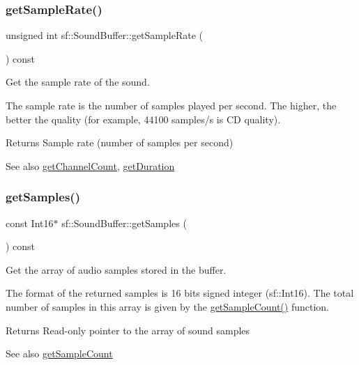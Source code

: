 \subsubsection{\texorpdfstring{get\+Sample\+Rate()}{getSampleRate()}}
{\footnotesize\ttfamily unsigned int sf\+::\+Sound\+Buffer\+::get\+Sample\+Rate (\begin{DoxyParamCaption}{ }\end{DoxyParamCaption}) const}



Get the sample rate of the sound. 

The sample rate is the number of samples played per second. The higher, the better the quality (for example, 44100 samples/s is CD quality).

\begin{DoxyReturn}{Returns}
Sample rate (number of samples per second)
\end{DoxyReturn}
\begin{DoxySeeAlso}{See also}
\hyperlink{classsf_1_1_sound_buffer_a127707b831d875ed790eef1aa2b9fcc3}{get\+Channel\+Count}, \hyperlink{classsf_1_1_sound_buffer_a280a581d9b360fd16121714c51fc8261}{get\+Duration} 
\end{DoxySeeAlso}
\mbox{\label{classsf_1_1_sound_buffer_ab9b2525a8da64cb266ba728aff7adecb}} 
\subsubsection{\texorpdfstring{get\+Samples()}{getSamples()}}
{\footnotesize\ttfamily const Int16$\ast$ sf\+::\+Sound\+Buffer\+::get\+Samples (\begin{DoxyParamCaption}{ }\end{DoxyParamCaption}) const}



Get the array of audio samples stored in the buffer. 

The format of the returned samples is 16 bits signed integer (sf\+::\+Int16). The total number of samples in this array is given by the \hyperlink{classsf_1_1_sound_buffer_aebe2a4bdbfbd9249353748da3f6a4fa1}{get\+Sample\+Count()} function.

\begin{DoxyReturn}{Returns}
Read-\/only pointer to the array of sound samples
\end{DoxyReturn}
\begin{DoxySeeAlso}{See also}
\hyperlink{classsf_1_1_sound_buffer_aebe2a4bdbfbd9249353748da3f6a4fa1}{get\+Sample\+Count} 
\end{DoxySeeAlso}
\mbox{\label{classsf_1_1_sound_buffer_a2be6a8025c97eb622a7dff6cf2594394}} 
